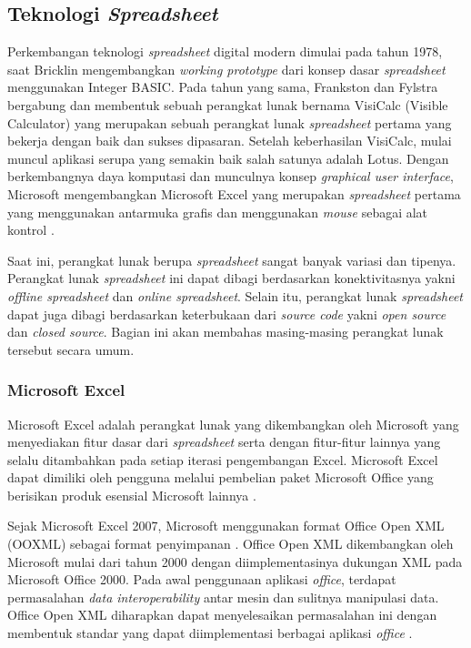 \subsection{Teknologi \textit{Spreadsheet}} \label{TeknologiSpreadsheet}
Perkembangan teknologi \textit{spreadsheet} digital modern dimulai pada tahun 1978, saat Bricklin mengembangkan \textit{working prototype} dari konsep dasar \textit{spreadsheet} menggunakan Integer BASIC. Pada tahun yang sama, Frankston dan Fylstra bergabung dan membentuk sebuah perangkat lunak bernama VisiCalc (Visible Calculator) yang merupakan sebuah perangkat lunak \textit{spreadsheet} pertama yang bekerja dengan baik dan sukses dipasaran. Setelah keberhasilan VisiCalc, mulai muncul aplikasi serupa yang semakin baik salah satunya adalah Lotus. Dengan berkembangnya daya komputasi dan munculnya konsep \textit{graphical user interface}, Microsoft mengembangkan Microsoft Excel yang merupakan \textit{spreadsheet} pertama yang menggunakan antarmuka grafis dan menggunakan \textit{mouse} sebagai alat kontrol \citep{power2004brief}.

Saat ini, perangkat lunak berupa \textit{spreadsheet} sangat banyak variasi dan tipenya. Perangkat lunak \textit{spreadsheet} ini dapat dibagi berdasarkan konektivitasnya yakni \textit{offline spreadsheet} dan \textit{online spreadsheet}. Selain itu, perangkat lunak \textit{spreadsheet} dapat juga dibagi berdasarkan keterbukaan dari \textit{source code} yakni \textit{open source} dan \textit{closed source}. Bagian ini akan membahas masing-masing perangkat lunak tersebut secara umum.

    \subsubsection{Microsoft Excel}
    Microsoft Excel adalah perangkat lunak yang dikembangkan oleh Microsoft yang menyediakan fitur dasar dari \textit{spreadsheet} serta dengan fitur-fitur lainnya yang selalu ditambahkan pada setiap iterasi pengembangan Excel. Microsoft Excel dapat dimiliki oleh pengguna melalui pembelian paket Microsoft Office yang berisikan produk esensial Microsoft lainnya \citep{MSExcelProduct}. 

    Sejak Microsoft Excel 2007, Microsoft menggunakan format Office Open XML (OOXML) sebagai format penyimpanan \citep{MSExcelSupport}. Office Open XML dikembangkan oleh Microsoft mulai dari tahun 2000 dengan diimplementasinya dukungan XML pada Microsoft Office 2000. Pada awal penggunaan aplikasi \textit{office}, terdapat permasalahan \textit{data interoperability} antar mesin dan sulitnya manipulasi data. Office Open XML diharapkan dapat menyelesaikan permasalahan ini dengan membentuk standar yang dapat diimplementasi berbagai aplikasi \textit{office} \citep{OOXMLFormat}.

